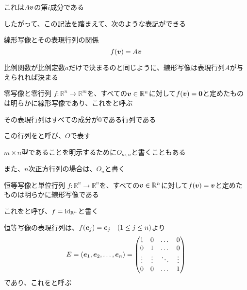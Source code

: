 \documentclass[../../topic_linear-map]{subfiles}
\begin{document}
これは$A\vb*{v}$の第$i$成分である

\br

したがって、この記法を踏まえて、次のような表記ができる

\begin{theorem}{線形写像とその表現行列の関係}
  \begin{equation*}
    f(\vb*{v}) = A\vb*{v}
  \end{equation*}
\end{theorem}

比例関数が比例定数$a$だけで決まるのと同じように、線形写像は表現行列$A$が与えられれば決まる

\sectionline

\begin{definition}{零写像と零行列}
  $f\colon \mathbb{R}^n \to \mathbb{R}^m$を、すべての$\vb*{v} \in \mathbb{R}^n$に対して$f(\vb*{v}) = \vb*{0}$と定めたものは明らかに線形写像であり、これをと呼ぶ

  その表現行列はすべての成分が0である行列である

  この行列をと呼び、$O$で表す
\end{definition}

$m \times n$型であることを明示するために$O_{m,n}$と書くこともある

また、$n$次正方行列の場合は、$O_n$と書く

\sectionline

\begin{definition}{恒等写像と単位行列}
  $f\colon \mathbb{R}^n \to \mathbb{R}^n$を、すべての$\vb*{v} \in \mathbb{R}^n$に対して$f(\vb*{v}) = \vb*{v}$と定めたものは明らかに線形写像である

  これをと呼び、$f = \operatorname{id}_{\mathbb{R}^n}$と書く

  恒等写像の表現行列は、$f(\vb*{e}_j) = \vb*{e}_j \quad (1 \leq j \leq n)$より
  \begin{equation*}
    E = (\vb*{e}_1, \vb*{e}_2, \dots, \vb*{e}_n) = \begin{pmatrix}
      1      & 0      & \dots  & 0      \\
      0      & 1      & \dots  & 0      \\
      \vdots & \vdots & \ddots & \vdots \\
      0      & 0      & \dots  & 1
    \end{pmatrix}
  \end{equation*}
  であり、これをと呼ぶ
\end{definition}
\end{document}
